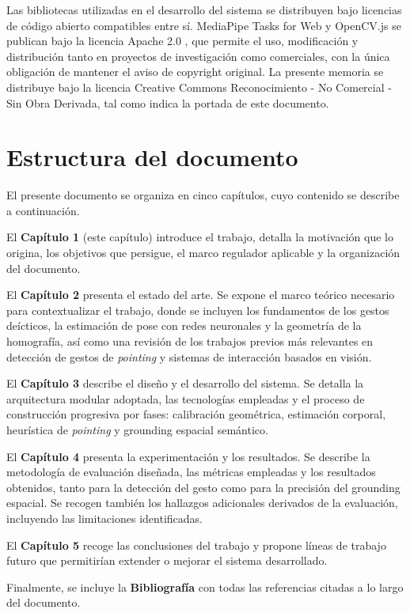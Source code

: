 \documentclass[12pt]{report} %
\begin{document}
Las bibliotecas utilizadas en el desarrollo del sistema se distribuyen bajo licencias de código abierto compatibles entre sí. MediaPipe Tasks for Web y OpenCV.js se publican bajo la licencia Apache 2.0 \citep{apache2}, que permite el uso, modificación y distribución tanto en proyectos de investigación como comerciales, con la única obligación de mantener el aviso de copyright original. La presente memoria se distribuye bajo la licencia Creative Commons Reconocimiento - No Comercial - Sin Obra Derivada, tal como indica la portada de este documento.

\section{Estructura del documento}

El presente documento se organiza en cinco capítulos, cuyo contenido se describe a continuación.

El \textbf{Capítulo 1} (este capítulo) introduce el trabajo, detalla la motivación que lo origina, los objetivos que persigue, el marco regulador aplicable y la organización del documento.

El \textbf{Capítulo 2} presenta el estado del arte. Se expone el marco teórico necesario para contextualizar el trabajo, donde se incluyen los fundamentos de los gestos deícticos, la estimación de pose con redes neuronales y la geometría de la homografía, así como una revisión de los trabajos previos más relevantes en detección de gestos de \textit{pointing} y sistemas de interacción basados en visión.

El \textbf{Capítulo 3} describe el diseño y el desarrollo del sistema. Se detalla la arquitectura modular adoptada, las tecnologías empleadas y el proceso de construcción progresiva por fases: calibración geométrica, estimación corporal, heurística de \textit{pointing} y grounding espacial semántico.

El \textbf{Capítulo 4} presenta la experimentación y los resultados. Se describe la metodología de evaluación diseñada, las métricas empleadas y los resultados obtenidos, tanto para la detección del gesto como para la precisión del grounding espacial. Se recogen también los hallazgos adicionales derivados de la evaluación, incluyendo las limitaciones identificadas.

El \textbf{Capítulo 5} recoge las conclusiones del trabajo y propone líneas de trabajo futuro que permitirían extender o mejorar el sistema desarrollado.

Finalmente, se incluye la \textbf{Bibliografía} con todas las referencias citadas a lo largo del documento.
\end{document}
